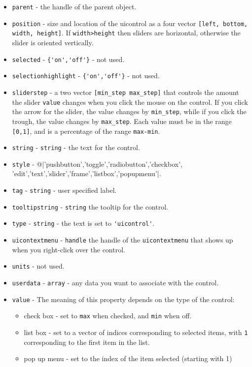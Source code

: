 \begin{itemize}
\begin{itemize}
\end{itemize}
\item \verb|parent| - the handle of the parent object.
\item \verb|position| - size and location of the uicontrol as a 
four vector \verb|[left, bottom, width, height]|.  If \verb|width>height|
then sliders are horizontal, otherwise the slider is oriented
vertically.
\item \verb|selected| - \verb|{'on','off'}| - not used.
\item \verb|selectionhighlight| - \verb|{'on','off'}| - not used.
\item \verb|sliderstep| - a two vector \verb|[min_step max_step]|
that controls the amount the slider \verb|value| changes when
you click the mouse on the control.  If you click the arrow
for the slider, the value changes by \verb|min_step|, while if
you click the trough, the value changes by \verb|max_step|.  
Each value must be in the range \verb|[0,1]|, and is a percentage
of the range \verb|max-min|.
\item \verb|string| - \verb|string| - the text for the control.
\item \verb|style| - @|{'pushbutton','toggle','radiobutton','checkbox',
'edit','text','slider','frame','listbox','popupmenu'}|.
\item \verb|tag| - \verb|string| - user specified label.
\item \verb|tooltipstring| - \verb|string| the tooltip for the control.
\item \verb|type| - \verb|string| - the text is set to \verb|'uicontrol'|.
\item \verb|uicontextmenu| - \verb|handle| the handle of the \verb|uicontextmenu|
that shows up when you right-click over the control.
\item \verb|units| - not used.
\item \verb|userdata| - \verb|array| - any data you want to associate with the
control.
\item \verb|value| - The meaning of this property depends on the type of the
control:
\begin{itemize}
\item  check box - set to \verb|max| when checked, and \verb|min| when off.

\item  list box - set to a vector of indices corresponding to selected
items, with \verb|1| corresponding to the first item in the list.

\item  pop up menu - set to the index of the item selected (starting with 1)


\end{itemize}
\end{itemize}

